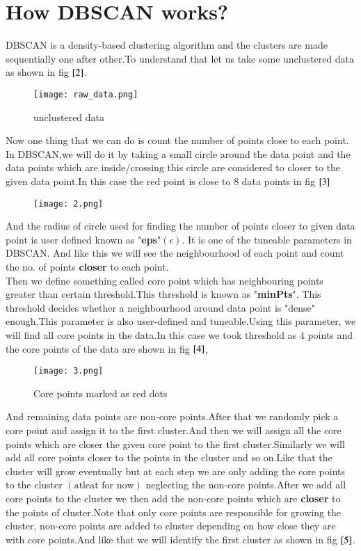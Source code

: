 \documentclass[journal,12pt,onecolumn]{IEEEtran}
\providecommand{\brak}[1]{\ensuremath{\left(#1\right)}}
\theoremstyle{remark}
\numberwithin{equation}{section}
\begin{document}
	          \section{How DBSCAN works?}
		    DBSCAN is a density-based clustering algorithm and the clusters are made sequentially one after other.To understand that let us take some unclustered data as shown in fig $\ref{2}$.
		    \begin{figure}[ht!]
		     \centering
		     \texttt{[image: raw\_data.png]}
		     \caption{unclustered data}
		     \label{2}
		    \end{figure}
	Now one thing that we can do is count the number of points close to each point. In DBSCAN,we will do it by taking a small circle around the data point and the data points which are inside/crossing this circle are considered to closer to the given data point.In this case the red point is close to 8 data points in fig $\ref{3}$
	      \begin{figure}[ht!]
		\centering
		\texttt{[image: 2.png]}
		\caption{}
		\label{3}
	      \end{figure}
	 And the radius of circle used for finding the number of points closer to given data point is user defined known as "\textbf{eps}"$\brak{\epsilon}$. It is one of the tuneable parameters in DBSCAN. And like this we will see the neighbourhood of each point and count the no. of points \textbf{closer} to each point.\\
	 Then we define something called core point which has neighbouring points greater than certain threshold.This threshold is known as "\textbf{minPts}". This threshold decides whether a neighbourhood around data point is "dense" enough.This parameter is also user-defined and tuneable.Using this parameter, we will find all core points in the data.In this case we took threshold as 4 points and  the core points of the data are shown in fig $\ref{4}$,\\
	     \begin{figure}[ht!]
	      \centering
	      \texttt{[image: 3.png]}
	      \caption{Core points marked as red dots}
	      \label{4}
             \end{figure}
	   And remaining data points are non-core points.After that we randomly pick a core point and assign it to the first cluster.And then we will assign all the core points which are closer the given core point to the first cluster.Similarly we will add all core points closer to the points in the cluster and so on.Like that the cluster will grow eventually but at each step we are only adding the core points to the cluster $\brak{\text{atleat for now}}$ neglecting the non-core points.After we add all core points to the cluster we then add the non-core points which are \textbf{closer} to the points of cluster.Note that only core points are responsible for growing the cluster, non-core points are added to cluster depending on how close they are with core points.And like that we will identify the first cluster as shown in fig $\ref{5}$.
\end{document}
